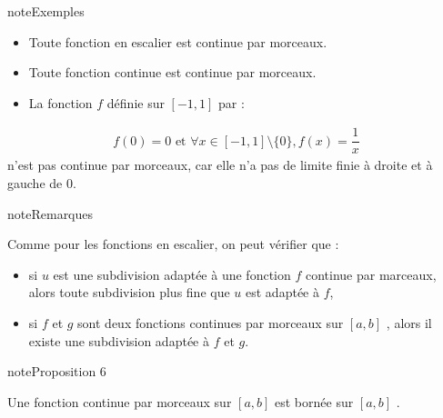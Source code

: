 \documentclass[letterpaper,10pt,french]{jupyterBook}
\begin{document}
\begin{sphinxadmonition}{note}{Exemples}
\begin{itemize}
\item {} 
\sphinxAtStartPar
Toute fonction en escalier est continue par morceaux.

\item {} 
\sphinxAtStartPar
Toute fonction continue est continue par morceaux.

\item {} 
\sphinxAtStartPar
La fonction \(f\) définie sur \([-1, 1]\) par :

\end{itemize}
\begin{equation*}
\begin{split}f(0)=0 \mbox{  et  } \forall x \in [-1, 1] \setminus \{0\}, f(x)=\dfrac{1}{x}
\end{split}
\end{equation*}
\sphinxAtStartPar
n’est pas continue par morceaux, car elle n’a pas de limite finie à droite et à gauche de \(0\).
\end{sphinxadmonition}

\begin{sphinxadmonition}{note}{Remarques}

\sphinxAtStartPar
Comme pour les fonctions en escalier, on peut vérifier que :
\begin{itemize}
\item {} 
\sphinxAtStartPar
si \(u\) est une subdivision adaptée à une fonction \(f\) continue par marceaux,
alors toute subdivision plus fine que \(u\) est adaptée à \(f\),

\item {} 
\sphinxAtStartPar
si \(f\) et \(g\) sont deux fonctions continues par morceaux sur \([a, b]\) , alors il existe
une subdivision adaptée à \(f\) et \(g\).

\end{itemize}
\end{sphinxadmonition}

\begin{sphinxadmonition}{note}{Proposition 6}

\sphinxAtStartPar
Une fonction continue par morceaux sur  \([a, b]\) est bornée sur \([a, b]\) .
\end{sphinxadmonition}
\end{document}
